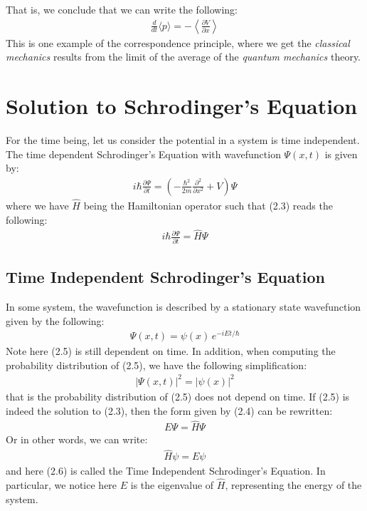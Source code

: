 \documentclass[11pt]{book}
\theoremstyle{break}
\theoremstyle{break}
\newcommand{\pd}{\partial}
\begin{document}
That is, we conclude that we can write the following:
\begin{align*}
\frac{d}{dt}\langle p\rangle = -\left\langle \frac{\pd V}{\pd x}\right\rangle
\end{align*}
This is one example of the correspondence principle, where we get the \textit{classical mechanics} results from the limit of the average of the \textit{quantum mechanics} theory.\\

\newpage
\section[Solution to Schrodinger's Equation]{\color{red} Solution to Schrodinger's Equation\color{black}}

For the time being, let us consider the potential in a system is time independent. The time dependent Schrodinger's Equation with wavefunction $\Psi(x,t)$ is given by:
\begin{align}
i\hbar \frac{\pd\Psi}{\pd t} = \left( - \frac{\hbar^2}{2m}\frac{\pd^2}{\pd x^2}+V\right) \Psi
\end{align}
where we have $\hat{H}$ being the Hamiltonian operator such that (2.3) reads the following:
\begin{align}
i\hbar \frac{\pd\Psi}{\pd t} = \hat{H}\Psi
\end{align}
\subsection{Time Independent Schrodinger's Equation}
In some system, the wavefunction is described by a stationary state wavefunction given by the following:
\begin{align}
\Psi(x,t) = \psi(x)\,e^{-iEt/\hbar}
\end{align}
Note here (2.5) is still dependent on time. In addition, when computing the probability distribution of (2.5), we have the following simplification:
\begin{align*}
|\Psi(x,t)|^2 = |\psi(x)|^2
\end{align*}
that is the probability distribution of (2.5) does not depend on time. If (2.5) is indeed the solution to (2.3), then the form given by (2.4) can be rewritten:
\begin{align*}
E\Psi = \hat{H}\Psi
\end{align*}
Or in other words, we can write:
\begin{align}
\hat{H}\psi = E\psi
\end{align}
and here (2.6) is called the Time Independent Schrodinger's Equation. In particular, we notice here $E$ is the eigenvalue of $\hat{H}$, representing the energy of the system.\\
\end{document}
